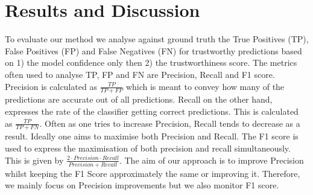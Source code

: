 \section{Results and Discussion} \label{sec:results}
To evaluate our method we analyse against ground truth the True Positives (TP), False Positives (FP) and False Negatives (FN) for trustworthy predictions based on 1) the model confidence only then 2) the trustworthiness score.  
%
The metrics often used to analyse TP, FP and FN are Precision, Recall and F1 score. Precision is calculated as $\frac{TP}{TP+FP}$  which is meant to convey how many of the predictions are accurate out of all predictions. Recall on the other hand, expresses the rate of the classifier getting correct predictions. This is calculated as $\frac{TP}{TP+FN}$. Often as one tries to increase Precision, Recall tends to decrease as a result. Ideally one aims to maximise both Precision and Recall. The F1 score is used to express the maximisation of both precision and recall simultaneously. This is given by $\frac{2\cdot Precision\cdot Recall}{Precision + Recall}$.
%
The aim of our approach is to improve Precision whilst keeping the F1 Score approximately the same or improving it. 
%
Therefore, we mainly focus on Precision improvements but we also monitor F1 score. 
%


